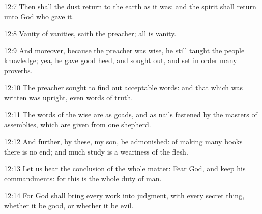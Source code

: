 12:7 Then shall the dust return to the earth as it was: and the spirit shall return unto God who gave it.

12:8 Vanity of vanities, saith the preacher; all is vanity.

12:9 And moreover, because the preacher was wise, he still taught the people knowledge; yea, he gave good heed, and sought out, and set in order many proverbs.

12:10 The preacher sought to find out acceptable words: and that which was written was upright, even words of truth.

12:11 The words of the wise are as goads, and as nails fastened by the masters of assemblies, which are given from one shepherd.

12:12 And further, by these, my son, be admonished: of making many books there is no end; and much study is a weariness of the flesh.

12:13 Let us hear the conclusion of the whole matter: Fear God, and keep his commandments: for this is the whole duty of man.

12:14 For God shall bring every work into judgment, with every secret thing, whether it be good, or whether it be evil.

